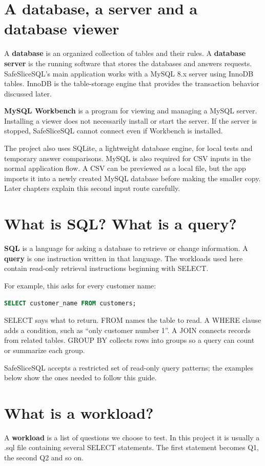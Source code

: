\documentclass[12pt,a4paper,oneside]{report}
\begin{document}
\section{A database, a server and a database viewer}
A \textbf{database} is an organized collection of tables and their rules. A \textbf{database server} is the running software that stores the databases and answers requests. SafeSliceSQL's main application works with a MySQL 8.x server using InnoDB tables. InnoDB is the table-storage engine that provides the transaction behavior discussed later.

\textbf{MySQL Workbench} is a program for viewing and managing a MySQL server. Installing a viewer does not necessarily install or start the server. If the server is stopped, SafeSliceSQL cannot connect even if Workbench is installed.

The project also uses SQLite, a lightweight database engine, for local tests and temporary answer comparisons. MySQL is also required for CSV inputs in the normal application flow. A CSV can be previewed as a local file, but the app imports it into a newly created MySQL database before making the smaller copy. Later chapters explain this second input route carefully.

\section{What is SQL? What is a query?}
\textbf{SQL} is a language for asking a database to retrieve or change information. A \textbf{query} is one instruction written in that language. The workloads used here contain read-only retrieval instructions beginning with SELECT.

For example, this asks for every customer name:
\begin{lstlisting}[language=SQL]
SELECT customer_name FROM customers;
\end{lstlisting}
SELECT says what to return. FROM names the table to read. A WHERE clause adds a condition, such as ``only customer number 1''. A JOIN connects records from related tables. GROUP BY collects rows into groups so a query can count or summarize each group.

SafeSliceSQL accepts a restricted set of read-only query patterns; the examples below show the ones needed to follow this guide.

\section{What is a workload?}
A \textbf{workload} is a list of questions we choose to test. In this project it is usually a .sql file containing several SELECT statements. The first statement becomes Q1, the second Q2 and so on.
\end{document}
